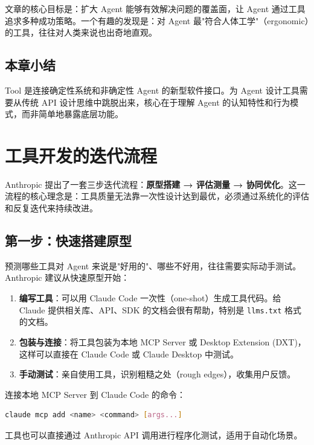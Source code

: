 \documentclass[a4paper]{article}
\begin{document}
文章的核心目标是：扩大 Agent 能够有效解决问题的覆盖面，让 Agent 通过工具追求多种成功策略。一个有趣的发现是：对 Agent 最"符合人体工学"（ergonomic）的工具，往往对人类来说也出奇地直观。

\subsection{本章小结}

Tool 是连接确定性系统和非确定性 Agent 的新型软件接口。为 Agent 设计工具需要从传统 API 设计思维中跳脱出来，核心在于理解 Agent 的认知特性和行为模式，而非简单地暴露底层功能。


\section{工具开发的迭代流程}

Anthropic 提出了一套三步迭代流程：\textbf{原型搭建 → 评估测量 → 协同优化}。这一流程的核心理念是：工具质量无法靠一次性设计达到最优，必须通过系统化的评估和反复迭代来持续改进。

\subsection{第一步：快速搭建原型}

预测哪些工具对 Agent 来说是"好用的"、哪些不好用，往往需要实际动手测试。Anthropic 建议从快速原型开始：

\begin{enumerate}[leftmargin=1.5em]
    \item \textbf{编写工具}：可以用 Claude Code 一次性（one-shot）生成工具代码。给 Claude 提供相关库、API、SDK 的文档会很有帮助，特别是 \texttt{llms.txt} 格式的文档。
    \item \textbf{包装与连接}：将工具包装为本地 MCP Server 或 Desktop Extension (DXT)，这样可以直接在 Claude Code 或 Claude Desktop 中测试。
    \item \textbf{手动测试}：亲自使用工具，识别粗糙之处（rough edges），收集用户反馈。
\end{enumerate}

连接本地 MCP Server 到 Claude Code 的命令：

\begin{lstlisting}[language=bash, caption={连接本地 MCP Server}]
claude mcp add <name> <command> [args...]
\end{lstlisting}

工具也可以直接通过 Anthropic API 调用进行程序化测试，适用于自动化场景。
\end{document}
